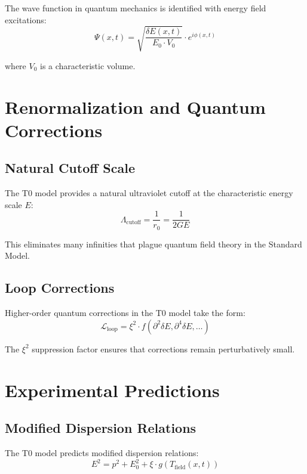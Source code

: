 \documentclass[12pt,a4paper]{report}
\begin{document}
	The wave function in quantum mechanics is identified with energy field excitations:
	\begin{equation}
		\Psi(x,t) = \sqrt{\frac{\delta E(x,t)}{E_0 \cdot V_0}} \cdot e^{i\phi(x,t)}
	\end{equation}
	
	where $V_0$ is a characteristic volume.
	
	\section{Renormalization and Quantum Corrections}
	
	\subsection{Natural Cutoff Scale}
	
	The T0 model provides a natural ultraviolet cutoff at the characteristic energy scale $E$:
	\begin{equation}
		\Lambda_{\text{cutoff}} = \frac{1}{r_0} = \frac{1}{2GE}
	\end{equation}
	
	This eliminates many infinities that plague quantum field theory in the Standard Model.
	
	\subsection{Loop Corrections}
	
	Higher-order quantum corrections in the T0 model take the form:
	\begin{equation}
		\mathcal{L}_{\text{loop}} = \xi^2 \cdot f(\partial^2\delta E, \partial^4\delta E, \ldots)
	\end{equation}
	
	The $\xi^2$ suppression factor ensures that corrections remain perturbatively small.
	
	\section{Experimental Predictions}
	
	\subsection{Modified Dispersion Relations}
	
	The T0 model predicts modified dispersion relations:
	\begin{equation}
		E^2 = p^2 + E_0^2 + \xi \cdot g(T_{\text{field}}(x,t))
	\end{equation}
	
\end{document}
